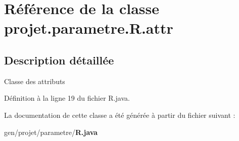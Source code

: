 \section{\-Référence de la classe projet.\-parametre.\-R.\-attr}
\label{classprojet_1_1parametre_1_1_r_1_1attr}


\subsection{\-Description détaillée}
\-Classe des attributs 

\-Définition à la ligne 19 du fichier \-R.\-java.



\-La documentation de cette classe a été générée à partir du fichier suivant \-:\begin{DoxyCompactItemize}
\item 
gen/projet/parametre/{\bf \-R.\-java}\end{DoxyCompactItemize}
